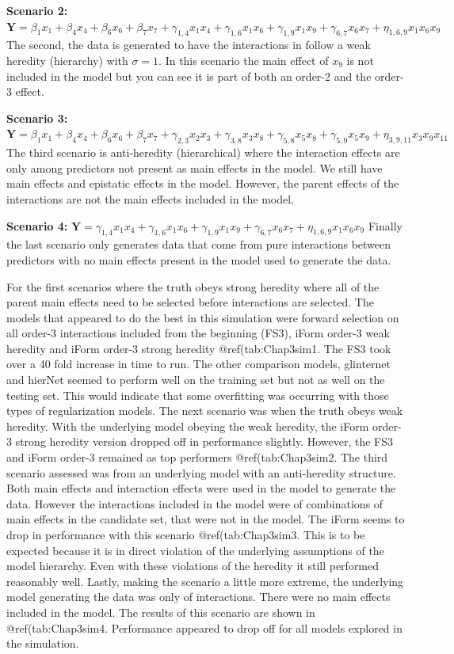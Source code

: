 \documentclass[11pt,]{book}
\theoremstyle{definition}
\theoremstyle{definition}
\theoremstyle{remark}
\begin{document}
\textbf{Scenario 2:}
\(\mathbf{Y}=\beta_1 x_1+\beta_4 x_4+\beta_6 x_6+\beta_7 x_7+\gamma_{1,4} x_1 x_4+\gamma_{1,6} x_1 x_6+\gamma_{1,9} x_1 x_9+\gamma_{6,7} x_6 x_7+\eta_{1,6,9} x_1 x_6 x_9\)
The second, the data is generated to have the interactions in follow a
weak heredity (hierarchy) with \(\sigma = 1\). In this scenario the main
effect of \(x_9\) is not included in the model but you can see it is
part of both an order-2 and the order-3 effect.

\textbf{Scenario 3:}
\(\mathbf{Y}=\beta_1 x_1+\beta_4 x_4+\beta_6 x_6+\beta_7 x_7+\gamma_{2,3} x_2 x_3+\gamma_{3,8} x_3 x_8+\gamma_{5,8} x_5 x_8+\gamma_{5,9} x_5 x_9+\eta_{3,9,11} x_3 x_9 x_11\)
The third scenario is anti-heredity (hierarchical) where the interaction
effects are only among predictors not present as main effects in the
model. We still have main effects and epistatic effects in the model.
However, the parent effects of the interactions are not the main effects
included in the model.

\textbf{Scenario 4:}
\(\mathbf{Y}=\gamma_{1,4} x_1 x_4+\gamma_{1,6} x_1 x_6+\gamma_{1,9} x_1 x_9+\gamma_{6,7} x_6 x_7+\eta_{1,6,9} x_1 x_6 x_9\)
Finally the last scenario only generates data that come from pure
interactions between predictors with no main effects present in the
model used to generate the data.

For the first scenarios where the truth obeys strong heredity where all
of the parent main effects need to be selected before interactions are
selected. The models that appeared to do the best in this simulation
were forward selection on all order-3 interactions included from the
beginning (FS3), iForm order-3 weak heredity and iForm order-3 strong
heredity @ref(tab:Chap3sim1. The FS3 took over a 40 fold increase in
time to run. The other comparison models, glinternet and hierNet seemed
to perform well on the training set but not as well on the testing set.
This would indicate that some overfitting was occurring with those types
of regularization models. The next scenario was when the truth obeys
weak heredity. With the underlying model obeying the weak heredity, the
iForm order-3 strong heredity version dropped off in performance
slightly. However, the FS3 and iForm order-3 remained as top performers
@ref(tab:Chap3sim2. The third scenario assessed was from an underlying
model with an anti-heredity structure. Both main effects and interaction
effects were used in the model to generate the data. However the
interactions included in the model were of combinations of main effects
in the candidate set, that were not in the model. The iForm seems to
drop in performance with this scenario @ref(tab:Chap3sim3. This is to be
expected because it is in direct violation of the underlying assumptions
of the model hierarchy. Even with these violations of the heredity it
still performed reasonably well. Lastly, making the scenario a little
more extreme, the underlying model generating the data was only of
interactions. There were no main effects included in the model. The
results of this scenario are shown in @ref(tab:Chap3sim4. Performance
appeared to drop off for all models explored in the simulation.
\end{document}
